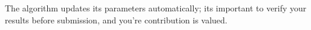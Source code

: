 The algorithm updates its parameters automatically; its important to verify your results before submission, and you're contribution is valued.
